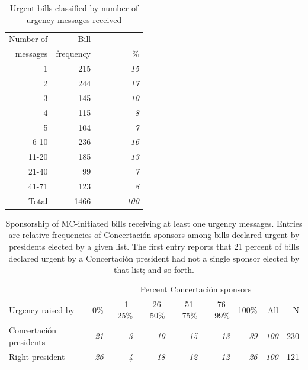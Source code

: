 \documentclass[letter,12pt]{article}
\newcommand{\mc}{\multicolumn}
\begin{document}
\begin{table}
\begin{center}
\begin{tabular}{rrr}
Number of &      Bill &     \\
messages  & frequency &  ~~~~~~~~\% \\ \hline
1                 &  215      &  \emph{15}   \\
2                 &  244      &  \emph{17}   \\
3                 &  145      &  \emph{10}   \\
4                 &  115      &  \emph{8}    \\
5                 &  104      &  \emph{7}    \\
6-10              &  236      &  \emph{16}   \\
11-20             &  185      &  \emph{13}   \\
21-40             &  99       &  \emph{7}    \\
41-71             &  123      &  \emph{8}    \\
Total             & 1466      & \emph{100}   \\ \hline
\end{tabular}
\caption{Urgent bills classified by number of urgency messages received}\label{T:billFreqByNurg}
\end{center}
\end{table}

\begin{table}
\begin{center}
\begin{small}
\begin{tabular}{lrrrrrrrr}
                         &  \mc{8}{c}{Percent Concertación sponsors} \\
Urgency raised by        &  0\%      &  1--25\%  &  26--50\%  &  51--75\%  &  76--99\%  &  100\%      &  All         &  N \\ \hline
Concertación presidents  & \emph{21} & \emph{3}  & \emph{10}  & \emph{15}  & \emph{13}  & \emph{39}   &  \emph{100}  &  230 \\
Right president          & \emph{26} & \emph{4}  & \emph{18}  & \emph{12}  & \emph{12}  & \emph{26}   &  \emph{100}  &  121 \\
\end{tabular}
\caption{Sponsorship of MC-initiated bills receiving at least one urgency messages. Entries are relative frequencies of Concertación sponsors among bills declared urgent by presidents elected by a given list. The first entry reports that 21 percent of bills declared urgent by a Concertación president had not a single sponsor elected by that list; and so forth.}\label{T:sponsorsOfUrgBills}
\end{small}
\end{center}
\end{table}
\end{document}

